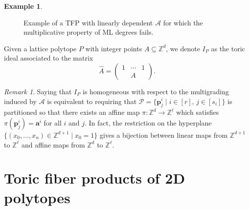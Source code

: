 \documentclass[12pt,reqno]{amsart}   	%
\theoremstyle{plain}
\theoremstyle{definition}
\newtheorem{example}[theorem]{Example}
\theoremstyle{remark}
\newtheorem{remark}[theorem]{Remark}
\newcommand{\Z}{\mathbb{Z}}
\begin{document}
\begin{example}
\begin{figure}[ht!]
    \caption{Example of a TFP with linearly dependent $\mathcal{A}$ for which the multiplicative property of ML degrees fails.}
\end{figure}
    
\end{example}

Given a lattice polytope $P$ with integer points $A \subseteq \Z^d$, we denote $I_P$ as the toric ideal associated to the matrix
\[
\hat{A} = \begin{pmatrix}
    1 & \cdots & 1 \\
     & A
\end{pmatrix}.
\]

\begin{remark}
    Saying that $I_{{P}}$ is homogeneous with respect to the multigrading induced by $\mathcal{A}$ is equivalent to requiring that $\mathcal{P} = \{\mathbf{p}^i_j \mid i \in [r],\,j \in [s_i]\}$ is partitioned so that there exists an {affine} map $\pi: \Z^d %
    \to \Z^{\ell}$ which satisfies $\pi(\mathbf{p}^i_j)=\mathbf{a}^i$ for all $i$ and $j$. In fact, the restriction on the hyperplane $\{(x_0,\dots,x_n) \in \Z^{d+1} \mid x_0 = 1 \}$ gives a bijection between linear maps from $\Z^{d+1}$ to $\Z^{\ell}$ and affine maps from $\Z^d$ to $\Z^{\ell}$.
\end{remark}

\section{Toric fiber products of 2D polytopes}
\end{document}
